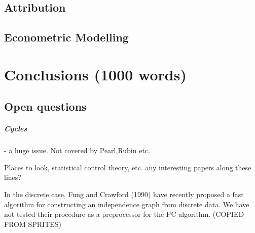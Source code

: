 \documentclass[11pt,a4paper,oneside]{book}
\begin{document}
\section*{Attribution}
\section*{Econometric Modelling}

\chapter*{Conclusions (1000 words)}

\section*{Open questions}
\paragraph{Cycles} - a huge issue. Not covered by Pearl,Rubin etc. 

Places to look, statistical control theory, etc. any interesting papers along these lines?

In the discrete case,
Fung and Crawford (1990) have recently proposed a fast algorithm for constructing an
independence graph from discrete data. We have not tested their procedure as a preprocessor for
the PC algorithm. (COPIED FROM SPRITES)


\end{document}
